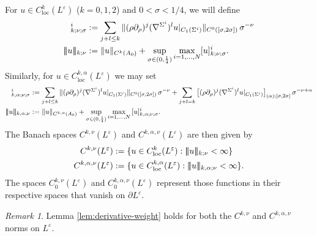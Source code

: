 \documentclass[11pt]{amsart}
\DeclarePairedDelimiter{\tnorm}{\vert\!\vert\!\vert}{\vert\!\vert\!\vert}
\theoremstyle{definition}
\theoremstyle{remark}
\newtheorem{remark}{Remark}
\begin{document}
For $u \in C_{\text{loc}}^k(L^\varepsilon)$ ($k = 0,1,2$) and $0 < \sigma < 1/4$,  we will define
\begin{align*}
    [u]_{k;\nu;\sigma}^i &:= \sum_{j + l \leq k}\|(\rho\partial_{\rho})^j (\nabla^{\Sigma^i})^l u\lvert_{C_1(\Sigma^i)}\|_{C^0([\sigma, 2\sigma])} \, \sigma^{-\nu}\\
    \tnorm{u}_{k;\nu} &:= \|u\|_{C^k(A_0)} + \sup_{\sigma \in (0,\frac{1}{4})} \max_{i = 1,\ldots,N} [u]_{k;\nu;\sigma}^i.
\end{align*}
Similarly, for $u \in C_{\text{loc}}^{k,\alpha}(L^\varepsilon)$ we may set
\begin{align*}
    [u]_{k,\alpha;\nu;\sigma}^i &:= \sum_{j + l \leq k}\|(\rho\partial_\rho)^j (\nabla^{\Sigma^i})^l u \lvert_{C_1(\Sigma^i)}\|_{C^0([\sigma, 2\sigma])} \, \sigma^{-\nu} + \sum_{j + l = k}\big[(\rho\partial_\rho)^j(\nabla^{\Sigma^i})^lu\lvert_{C_1(\Sigma^i)}\big]_{(\alpha); [\sigma,2\sigma]} \, \sigma^{-\nu + \alpha}\\
    \tnorm{u}_{k,\alpha;\nu} &:= \|u\|_{C^{k,\alpha}(A_0)} + \sup_{\sigma \in (0,\frac{1}{4})} \max_{i = 1,\ldots,N} \,[u]_{k,\alpha;\nu;\sigma}^i.
\end{align*}
The Banach spaces $C^{k,\nu}(L^\varepsilon)$ and $C^{k,\alpha,\nu}(L^\varepsilon)$ are then given by
\begin{align*}
    C^{k,\nu}(L^\varepsilon) &:= \{u \in C_{\text{loc}}^k(L^\varepsilon) : \tnorm{u}_{k;\nu} < \infty\} \\
    C^{k,\alpha, \nu}(L^\varepsilon) &:= \{u \in C_{\text{loc}}^{k,\alpha}(L^\varepsilon) : \tnorm{u}_{k,\alpha;\nu} < \infty\}.
\end{align*}
The spaces $C_0^{k,\nu}(L^\varepsilon)$ and $C_0^{k,\alpha,\nu}(L^\varepsilon)$ represent those functions in their respective spaces that vanish on $\partial L^\varepsilon$.
\begin{remark}
    Lemma \ref{lem:derivative-weight} holds for both the $C^{k,\nu}$ and $C^{k,\alpha,\nu}$ norms on $L^\varepsilon$.
\end{remark}
\end{document}
